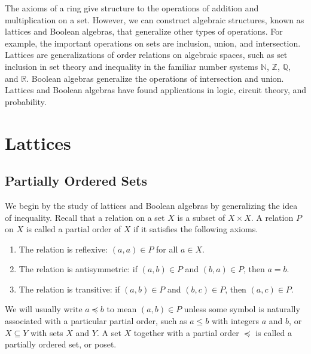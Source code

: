 
The axioms of a ring give structure to the operations of addition and multiplication on a set.  However, we can construct algebraic structures, known as lattices and Boolean algebras, that generalize other types of operations.  For example, the important operations on sets are inclusion, union, and intersection.  Lattices  are generalizations of order relations on algebraic spaces, such as set inclusion in set theory and inequality in the  familiar number systems ${\mathbb N}$, ${\mathbb Z}$, ${\mathbb Q}$, and ${\mathbb R}$.  Boolean algebras generalize the operations of intersection and union. Lattices and Boolean algebras have found applications in logic, circuit theory, and probability.   


\section{Lattices}\label{boolean_lattices}

\subsection*{Partially Ordered Sets}

We begin by the study of lattices and Boolean algebras by generalizing the idea of inequality. Recall that a {\bfi relation\/} on a set $X$ is a subset of $X \times X$.  A relation $P$ on $X$ is called a {\bfi partial order\/} of $X$ if it satisfies the following axioms.  
\begin{enumerate}

\item
The relation is {\bfi reflexive}: $(a, a) \in P$ for all $a \in X$.

\item
The relation is {\bfi antisymmetric}: if $(a,b) \in P$ and $(b,a) \in P$, then $a = b$.

\item
The relation is {\bfi transitive}: if $(a, b) \in P$ and $(b, c) \in P$, then $(a, c) \in P$.
 
\end{enumerate}
We will usually write $a \preceq b$\label{lessthan} to mean $(a, b) \in P$  unless some symbol is naturally associated with a particular partial order, such as $a \leq b$ with integers $a$ and $b$, or $X \subseteq Y$ with sets $X$ and $Y$.  A set $X$ together with a partial order $\preceq$ is called a {\bfi partially ordered set}, or {\bfi poset}. 

